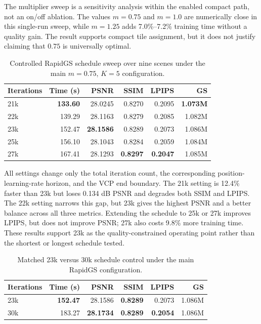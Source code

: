 The multiplier sweep is a sensitivity analysis within the enabled compact
path, not an on/off ablation. The values $m=0.75$ and $m=1.0$ are numerically
close in this single-run sweep, while $m=1.25$ adds 7.0\%--7.2\% training time without a
quality gain. The result supports compact tile assignment, but it does not
justify claiming that $0.75$ is universally optimal.

\begin{table}[H]
\centering
\caption{Controlled RapidGS schedule sweep over nine scenes under the main
$m=0.75$, $K=5$ configuration.}
\label{tab:schedule-sweep}
\begin{tabular}{lrrrrr}
\toprule
Iterations & Time (s) & PSNR & SSIM & LPIPS & GS \\
\midrule
21k & \textbf{133.60} & 28.0245 & 0.8270 & 0.2095 & \textbf{1.073M} \\
22k & 139.29 & 28.1163 & 0.8279 & 0.2085 & 1.082M \\
23k & 152.47 & \textbf{28.1586} & 0.8289 & 0.2073 & 1.086M \\
25k & 156.10 & 28.1043 & 0.8284 & 0.2059 & 1.084M \\
27k & 167.41 & 28.1293 & \textbf{0.8297} & \textbf{0.2047} & 1.085M \\
\bottomrule
\end{tabular}
\end{table}

All settings change only the total iteration count, the corresponding
position-learning-rate horizon, and the VCP end boundary. The 21k setting is
12.4\% faster than 23k but loses 0.134 dB PSNR and degrades both SSIM and
LPIPS. The 22k setting narrows this gap, but 23k gives the highest PSNR and a
better balance across all three metrics. Extending the schedule to 25k or 27k
improves LPIPS, but does not improve PSNR; 27k also costs 9.8\% more training
time. These results support 23k as the quality-constrained operating point
rather than the shortest or longest schedule tested.

\begin{table}[H]
\centering
\caption{Matched 23k versus 30k schedule control under the main RapidGS
configuration.}
\label{tab:schedule-ablation}
\begin{tabular}{lrrrrr}
\toprule
Iterations & Time (s) & PSNR & SSIM & LPIPS & GS \\
\midrule
23k & \textbf{152.47} & 28.1586 & \textbf{0.8289} & 0.2073 & 1.086M \\
30k & 183.27 & \textbf{28.1734} & \textbf{0.8289} & \textbf{0.2054} & 1.086M \\
\bottomrule
\end{tabular}
\end{table}

